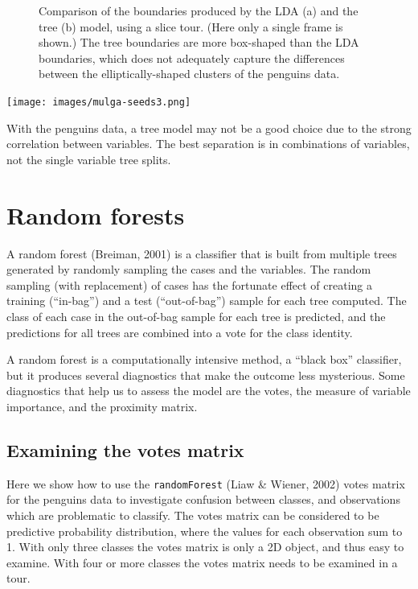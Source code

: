 \documentclass[
  letterpaper,
]{krantz}
\newcommand{\insightbox}[1]{%
\noindent\colorbox{insight!30}{%
\begin{minipage}{0.98\textwidth}%
    \centering%
    \begin{minipage}[c]{0.15\textwidth} %
      \texttt{[image: images/mulga-seeds3.png]} %
    \end{minipage}%
    \hfill %
    \begin{minipage}[c]{0.8\textwidth} %
      \bigskip%
      \textsf{#1}%
      \bigskip%
    \end{minipage}%
    \hspace*{3mm}%
  \end{minipage}%
}%
}
\begin{document}
\begin{figure}
\begin{minipage}{0.50\linewidth}
{}


\end{minipage}%

\caption{\label{fig-penguins-lda-tree-pdf}Comparison of the boundaries
produced by the LDA (a) and the tree (b) model, using a slice tour.
(Here only a single frame is shown.) The tree boundaries are more
box-shaped than the LDA boundaries, which does not adequately capture
the differences between the elliptically-shaped clusters of the penguins
data.}

\end{figure}%

\insightbox{With the penguins data, a tree model may not be a good choice due to the strong correlation between variables. The best separation is in combinations of variables, not the single variable tree splits.}

\section{Random forests}\label{random-forests}


A random forest (Breiman, 2001) is a classifier that is built from
multiple trees generated by randomly sampling the cases and the
variables. The random sampling (with replacement) of cases has the
fortunate effect of creating a training (``in-bag'') and a test
(``out-of-bag'') sample for each tree computed. The class of each case
in the out-of-bag sample for each tree is predicted, and the predictions
for all trees are combined into a vote for the class identity.

A random forest is a computationally intensive method, a ``black box''
classifier, but it produces several diagnostics that make the outcome
less mysterious. Some diagnostics that help us to assess the model are
the votes, the measure of variable importance, and the proximity matrix.

\subsection{Examining the votes matrix}\label{sec-votes}

Here we show how to use the \texttt{randomForest} (Liaw \& Wiener, 2002)
votes matrix for the penguins data to investigate confusion between
classes, and observations which are problematic to classify. The votes
matrix can be considered to be predictive probability distribution,
where the values for each observation sum to 1. With only three classes
the votes matrix is only a 2D object, and thus easy to examine. With
four or more classes the votes matrix needs to be examined in a tour.
\end{document}
